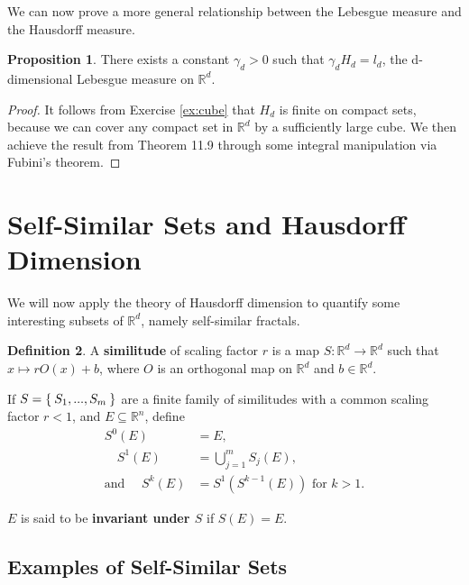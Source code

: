 \documentclass[11pt]{amsart}
\theoremstyle{definition}
\newtheorem{definition}{Definition}[section]
\newtheorem{prop}[definition]{Proposition}
\newcommand{\R}{\ensuremath{\mathbb{R}}}
\begin{document}
We can now prove a more general relationship between the Lebesgue measure and the Hausdorff measure.

\begin{prop}
	There exists a constant \( \gamma_d > 0 \) such that \( \gamma_d H_d = l_d \), the d-dimensional Lebesgue measure on \( \R^d \).
\end{prop}

\begin{proof}
	It follows from Exercise \ref{ex:cube} that \( H_d \) is finite on compact sets, because we can cover any compact set in \( \R^d \) by a sufficiently large cube.
	We then achieve the result from Theorem 11.9 through some integral manipulation via Fubini's theorem.
\end{proof}

\section{Self-Similar Sets and Hausdorff Dimension}

We will now apply the theory of Hausdorff dimension to quantify some interesting subsets of \( \R^d \), namely self-similar fractals. 

\begin{definition}
	A \textbf{similitude} of scaling factor \( r \) is a map \( S: \R^d \rightarrow \R^d \) such that \( x \mapsto rO(x) + b \), where \( O \) is an orthogonal map on \( \R^d \) and \( b \in \R^d \).
\end{definition}

If \( S = \Set{S_1, ..., S_m} \) are a finite family of similitudes with a common scaling factor \( r < 1 \), and \(E \subseteq \R^n\), define
\begin{align}
	S^0(E) & = E, \\
	 \quad S^1(E) & = \bigcup_{j = 1}^{m} S_j(E), \\
	 \text{and } \quad S^k(E) & = S^1(S^{k-1}(E)) \text{ for } k > 1 .
\end{align}

\( E \) is said to be \textbf{invariant under \( S \)} if \( S(E) = E \).

\subsection{Examples of Self-Similar Sets}
\end{document}

